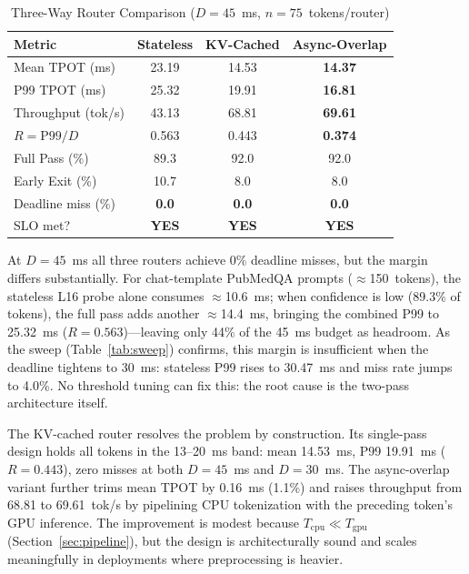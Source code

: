 \documentclass[conference]{IEEEtran}
\begin{document}
\begin{table}[htbp]
\caption{Three-Way Router Comparison ($D=45$~ms, $n=75$~tokens/router)}
\centering
\setlength{\tabcolsep}{3pt}
\begin{tabular}{@{}lccc@{}}
\toprule
\textbf{Metric} & \textbf{Stateless} & \textbf{KV-Cached} & \textbf{Async-Overlap} \\
\midrule
Mean TPOT (ms)     & 23.19 & 14.53          & \textbf{14.37} \\
P99 TPOT (ms)      & 25.32 & 19.91          & \textbf{16.81} \\
Throughput (tok/s) & 43.13 & 68.81          & \textbf{69.61} \\
$R = \text{P99}/D$ & 0.563 & 0.443          & \textbf{0.374} \\
Full Pass (\%)     & 89.3  & 92.0           & 92.0 \\
Early Exit (\%)    & 10.7  & 8.0            & 8.0 \\
Deadline miss (\%) & \textbf{0.0} & \textbf{0.0} & \textbf{0.0} \\
SLO met?           & \textbf{YES} & \textbf{YES} & \textbf{YES} \\
\bottomrule
\end{tabular}
\label{tab:comparison}
\end{table}

At $D=45$~ms all three routers achieve 0\% deadline misses, but the
margin differs substantially.
For chat-template PubMedQA prompts ($\approx$150~tokens), the stateless
L16 probe alone consumes $\approx$10.6~ms; when confidence is low
(89.3\% of tokens), the full pass adds another $\approx$14.4~ms,
bringing the combined P99 to 25.32~ms ($R=0.563$)---leaving only
44\% of the 45~ms budget as headroom.
As the sweep (Table~\ref{tab:sweep}) confirms, this margin is
insufficient when the deadline tightens to 30~ms: stateless P99 rises
to 30.47~ms and miss rate jumps to 4.0\%.
No threshold tuning can fix this: the root cause is the two-pass
architecture itself.

The KV-cached router resolves the problem by construction.
Its single-pass design holds all tokens in the 13--20~ms band: mean
14.53~ms, P99 19.91~ms ($R=0.443$), zero misses at both $D=45$~ms and
$D=30$~ms.
The async-overlap variant further trims mean TPOT by 0.16~ms (1.1\%) and
raises throughput from 68.81 to 69.61~tok/s by pipelining CPU tokenization
with the preceding token's GPU inference.
The improvement is modest because $T_{\text{cpu}} \ll T_{\text{gpu}}$
(Section~\ref{sec:pipeline}), but the design is architecturally sound and
scales meaningfully in deployments where preprocessing is heavier.
\end{document}

